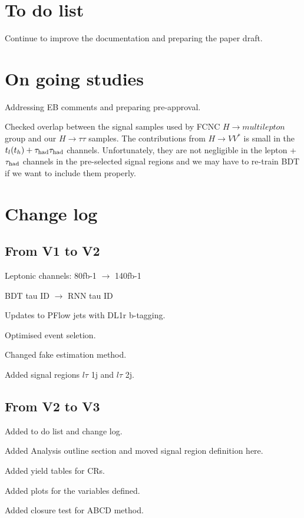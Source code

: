\section{To do list}

Continue to improve the documentation and preparing the paper draft.

\section{On going studies}

Addressing EB comments and preparing pre-approval.

Checked overlap between the signal samples used by FCNC $H\to multilepton$ group and our $H\rightarrow \tau\tau$ samples. The contributions from $H\rightarrow VV^*$ is small in the $t_l(t_h)+\tau_\text{had}{}\tau_\text{had}$ channels.
Unfortunately, they are not negligible in the lepton + $\tau_\text{had}$ channels in the pre-selected signal regions and we may have to re-train BDT if we want to include them properly. 

\section{Change log}

\subsection{From V1 to V2}

Leptonic channels:  80fb-1 $\to$ 140fb-1

BDT tau ID $\to$ RNN tau ID

Updates to PFlow jets with DL1r b-tagging.

Optimised event seletion.

Changed fake estimation method.

Added signal regions $l\tau$ 1j and $l\tau$ 2j.

\subsection{From V2 to V3}

Added to do list and change log.

Added Analysis outline section and moved signal region definition here.

Added yield tables for CRs.

Added plots for the variables defined.

Added closure test for ABCD method.


